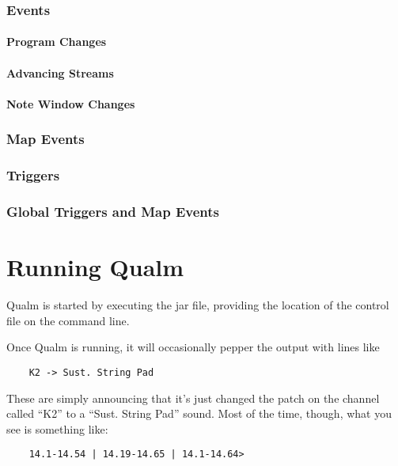 \documentclass{article}
\newcommand{\q}{{\textsf{Qualm}}\xspace}
\begin{document}
\subsubsection{Events}

\paragraph{Program Changes}
\paragraph{Advancing Streams}
\paragraph{Note Window Changes}

\subsubsection{Map Events}

\subsubsection{Triggers}

\subsubsection{Global Triggers and Map Events}

\begin{latexonly}
\newpage
\end{latexonly}
\section{Running \q}

\q is started by executing the jar file, providing the location of the
control file on the command line.

Once \q is running, it will occasionally pepper the output with lines
like

\begin{verbatim}
    K2 -> Sust. String Pad
\end{verbatim}

These are simply announcing that it's just changed the patch on the
channel called ``K2'' to a ``Sust. String Pad'' sound.  Most of the time,
though, what you see is something like:

\begin{verbatim}
    14.1-14.54 | 14.19-14.65 | 14.1-14.64>
\end{verbatim}
\end{document}
